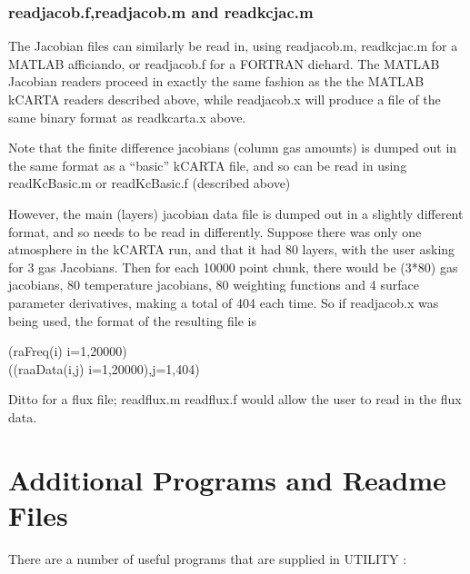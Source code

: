 \documentclass[12pt]{article}
\newcommand{\kc}{\textsf{kCARTA}\xspace}
\newcommand{\ttab}{\indent\indent}
\begin{document}
{{{{\subsubsection{readjacob.f,readjacob.m and readkcjac.m}

The Jacobian files can similarly be read in, using {\sf readjacob.m, 
readkcjac.m} for a  {\sf MATLAB} afficiando, or {\sf readjacob.f} for a 
FORTRAN diehard. 
The {\sf MATLAB} Jacobian readers proceed in exactly the same fashion as the 
the {\sf MATLAB} \kc readers described above, while {\sf readjacob.x} will 
produce a file of the same binary format as {\sf readkcarta.x} above.  

Note that the finite difference jacobians (column gas amounts) is dumped out
in the same format as a ``basic'' \kc file, and so can be read in using
readKcBasic.m or readKcBasic.f (described above)

However, the main (layers) jacobian data file is dumped out in a slightly 
different format, and so needs to be read in differently.
Suppose there was only one atmosphere in the \kc run, 
and that it had 80 layers, with the user asking for 3 gas Jacobians.  
Then for each 10000 point chunk, there would be (3*80) gas jacobians, 
80 temperature jacobians, 80 weighting functions and 4 surface parameter 
derivatives, making a total of 404 each time.  So if {\sf readjacob.x} was
being used, the format of the resulting file is

\smallskip
\ttab (raFreq(i) i=1,20000) \\
\ttab ((raaData(i,j) i=1,20000),j=1,404)

Ditto for a flux file; {\sf readflux.m} {\sf readflux.f} would allow the user 
to read in the flux data.

\section{Additional Programs and Readme Files}

There are a number of useful programs that are supplied in UTILITY :

}}}}
\end{document}
